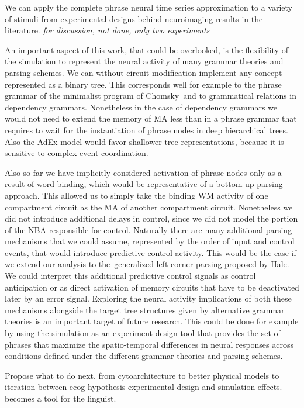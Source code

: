\documentclass[10pt]{article}
\begin{document}
We can apply the complete phrase neural time series approximation to a variety of stimuli from experimental designs behind neuroimaging results in the literature. \emph{for discussion, not done, only two experiments}

An important aspect of this work, that could be overlooked, is the flexibility of the simulation to represent the neural activity of many grammar theories and parsing schemes.
We can without circuit modification implement any concept represented as a binary tree.
This corresponds well for example to the phrase grammar of the minimalist program of Chomsky\cite{Chomsky_2014}~and to grammatical relations in dependency grammars\cite{nivre2005dependency}.
Nonetheless in the case of dependency grammars we would not need to extend the memory of MA less than in a phrase grammar that requires to wait for the instantiation of phrase nodes in deep hierarchical trees.
Also the AdEx model would favor shallower tree representations, because it is sensitive to complex event coordination.

Also so far we have implicitly considered activation of phrase nodes only as a result of word binding, which would be representative of a bottom-up parsing approach.
This allowed us to simply take the binding WM activity of one compartment circuit as the MA of another compartment circuit.
Nonetheless we did not introduce additional delays in control, since we did not model the portion of the NBA responsible for control.
Naturally there are many additional parsing mechanisms that we could assume, represented by the order of input and control events, that would introduce predictive control activity.
This would be the case if we extend our analysis to the~generalized left corner parsing proposed by Hale\cite{hale2014automaton}.
We could interpret this additional predictive control signals as control anticipation or as direct activation of memory circuits that have to be deactivated later by an error signal.
Exploring the neural activity implications of both these mechanisms alongside the target tree structures given by alternative grammar theories is an important target of future research.
This could be done for example by using the simulation as an experiment design tool that provides the set of phrases that maximize the spatio-temporal differences in neural responses across conditions defined under the different grammar theories and parsing schemes.


Propose what to do next. from cytoarchitecture to better physical models to iteration between ecog hypothesis experimental design and simulation effects. becomes a tool for the linguist.
\end{document}
